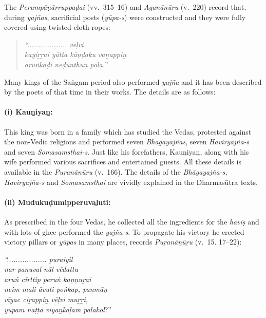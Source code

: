 The \textit{Perumpāṇāṟṟuppaḍai} (vv.~315–16) and \textit{Aganāṉūṟu} (v.~220) record that, during \textit{yajñas}, sacrificial posts (\textit{yūpa-s}) were constructed and they were fully covered using twisted cloth ropes:

\begin{quote}
\textit{“.................. vēḷvi}\\\textit{kayiṟṟai yātta kāṇḍaku vaṉappiṉ}\\\textit{aruṅkaḍi neḍunthūṇ pōla.}”
\end{quote}

Many kings of the Saṅgam period also performed \textit{yajña} and it has been described by the poets of that time in their works. The details are as follows:

\paragraph*{(i) Kauṉiyaṉ:}

\vskip -7pt

This king was born in a family which has studied the Vedas, protested against the non-Vedic religions and performed seven \textit{Bhāgayajñas}, seven \textit{Haviryajña-s} and seven \textit{Somasamsthai-s}. Just like his forefathers, Kauṉiyaṉ, along with his wife performed various sacrifices and entertained guests. All these details is available in the \textit{Puṟanāṉūṟu} (v.~166). The details of the \textit{Bhāgayajña-s, Haviryajña-s} and \textit{Somasamsthai} are vividly explained in the Dharmasūtra texts.


\paragraph*{(ii) Mudukuḍumipperuvaḻuti:}

\vskip -7pt

As prescribed in the four Vedas, he collected all the ingredients for the \textit{haviṣ} and with lots of ghee performed the \textit{yajña-s}. To propagate his victory he erected victory pillars or \textit{yūpas} in many places, records \textit{Puṟanāṉūṟu} (v.~15. 17–22):

\textit{“.................. puraiyil}\\\textit{naṟ paṉuval nāl vēdattu}\\\textit{aruñ cīrttip peruṅ kaṇṇuṟai}\\\textit{neim mali āvuti poṅkap, paṉmāṇ}\\\textit{vīyac ciṟappiṉ vēḷvi muṟṟi,}\\\textit{yūpam naṭṭa viyaṉkaḷam palakol}?”


